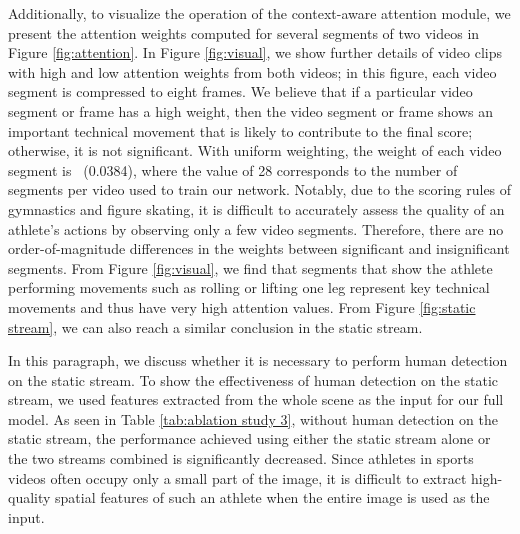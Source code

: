 \documentclass[sigconf]{acmart}
\begin{document}
Additionally, to visualize the operation of the context-aware attention module, we present the attention weights computed for several segments of two videos in Figure \ref{fig:attention}. In Figure \ref{fig:visual}, we show further details of video clips with high and low attention weights from both videos; in this figure, each video segment is compressed to eight frames. We believe that if a particular video segment or frame has a high weight, then the video segment or frame shows an important technical movement that is likely to contribute to the final score; otherwise, it is not significant. With uniform weighting, the weight of each video segment is ~(0.0384), where the value of 28 corresponds to the number of segments per video used to train our network. Notably, due to the scoring rules of gymnastics and figure skating, it is difficult to accurately assess the quality of an athlete's actions by observing only a few video segments. Therefore, there are no order-of-magnitude differences in the weights between significant and insignificant segments. From Figure \ref{fig:visual}, we find that segments that show the athlete performing movements such as rolling or lifting one leg represent key technical movements and thus have very high attention values. From Figure \ref{fig:static stream}, we can also reach a similar conclusion in the static stream.

\vspace{5pt}

 In this paragraph, we discuss whether it is necessary to perform human detection on the static stream. To show the effectiveness of human detection on the static stream, we used features extracted from the whole scene as the input for our full model. As seen in Table \ref{tab:ablation study 3}, without human detection on the static stream, the performance achieved using either the static stream alone or the two streams combined is significantly decreased. Since athletes in sports videos often occupy only a small part of the image, it is difficult to extract high-quality spatial features of such an athlete when the entire image is used as the input.
\end{document}
